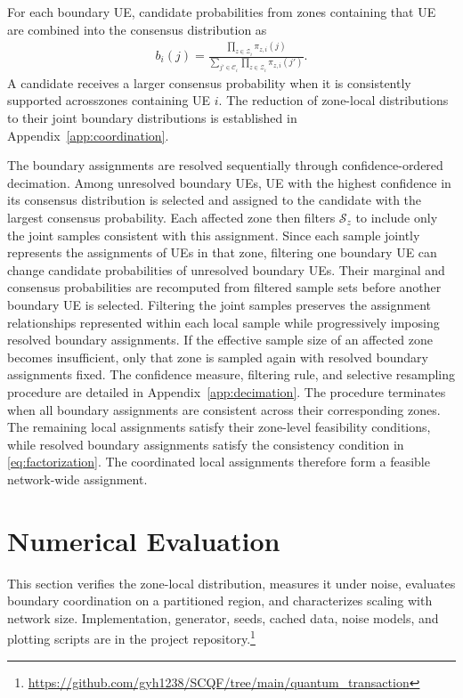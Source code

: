 \documentclass[journal]{IEEEtran}
\begin{document}
{{For each boundary UE, candidate probabilities from zones containing that UE are combined into the consensus distribution as
\begin{align}
b_i(j)=\frac{\prod_{z\in\mathcal{Z}_i}\pi_{z,i}(j)}{\sum_{j'\in\mathcal{C}_i}\prod_{z\in\mathcal{Z}_i}\pi_{z,i}(j')}.
\label{eq:boundary-belief}
\end{align}
A candidate receives a larger consensus probability when it is consistently supported acrosszones containing UE $i$. The
reduction of zone-local distributions to their joint boundary distributions is established in Appendix~\ref{app:coordination}.

The boundary assignments are resolved sequentially through confidence-ordered decimation. Among unresolved boundary UEs, UE with the highest confidence in its consensus distribution is selected and assigned to the candidate with the largest consensus probability. Each affected zone then filters $\mathcal{S}_z$ to include only the joint samples consistent with this assignment. Since each sample jointly represents the assignments of UEs in that zone, filtering one boundary UE can change candidate probabilities of unresolved boundary UEs. Their marginal and consensus probabilities are recomputed from filtered sample sets before another boundary UE is selected.
Filtering the joint samples preserves the assignment relationships represented within each local sample while progressively imposing resolved boundary assignments. If the effective sample size of an affected zone becomes insufficient, only that zone is sampled again with resolved boundary assignments fixed. The confidence measure, filtering rule, and selective resampling procedure are detailed in Appendix~\ref{app:decimation}.
The procedure terminates when all boundary assignments are consistent across their corresponding zones. The remaining local assignments
satisfy their zone-level feasibility conditions, while resolved boundary assignments satisfy the consistency condition in \eqref{eq:factorization}. The coordinated local assignments therefore form a feasible network-wide assignment.
}

\section{Numerical Evaluation}
\label{sec:eval}

This section verifies the zone-local distribution, measures it under noise, evaluates boundary coordination on a partitioned region, and characterizes scaling with network size. Implementation, generator, seeds, cached data, noise models, and plotting scripts are in the project repository.\footnote{\url{https://github.com/gyh1238/SCQF/tree/main/quantum_transaction}}

}
\end{document}
